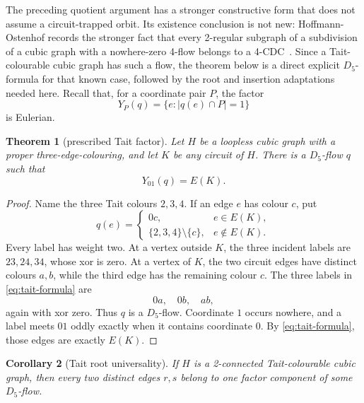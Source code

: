 \documentclass[11pt]{article}
\newtheorem{theorem}{Theorem}
\newtheorem{corollary}[theorem]{Corollary}
\theoremstyle{definition}
\theoremstyle{remark}
\begin{document}
The preceding quotient argument has a stronger constructive form that does
not assume a circuit-trapped orbit.  Its existence conclusion is not new:
Hoffmann-Ostenhof records the stronger fact that every 2-regular subgraph
of a subdivision of a cubic graph with a nowhere-zero 4-flow belongs to a
4-CDC~\cite[Lemma~0.2]{HoffmannOstenhof2012}.  Since a Tait-colourable
cubic graph has such a flow, the theorem below is a direct explicit
\(D_5\)-formula for that known case, followed by the root and insertion
adaptations needed here.  Recall that, for a coordinate pair \(P\), the factor
\[
                  Y_P(q)=\{e:|q(e)\cap P|=1\}
\]
is Eulerian.

\begin{theorem}[prescribed Tait factor]\label{thm:prescribed-tait-factor}
Let \(H\) be a loopless cubic graph with a proper three-edge-colouring, and
let \(K\) be any circuit of \(H\).  There is a \(D_5\)-flow \(q\) such that
\[
                         Y_{01}(q)=E(K).
\]
\end{theorem}

\begin{proof}
Name the three Tait colours \(2,3,4\).  If an edge \(e\) has colour \(c\),
put
\begin{equation}
 q(e)=
 \begin{cases}
   0c,&e\in E(K),\\
   \{2,3,4\}\setminus\{c\},&e\notin E(K).
 \end{cases}                                                 \tag{T}\label{eq:tait-formula}
\end{equation}
Every label has weight two.  At a vertex outside \(K\), the three incident
labels are \(23,24,34\), whose xor is zero.  At a vertex of \(K\), the two
circuit edges have distinct colours \(a,b\), while the third edge has the
remaining colour \(c\).  The three labels in \eqref{eq:tait-formula} are
\[
                              0a,\quad 0b,\quad ab,
\]
again with xor zero.  Thus \(q\) is a \(D_5\)-flow.  Coordinate \(1\)
occurs nowhere, and a label meets \(01\) oddly exactly when it contains
coordinate \(0\).  By \eqref{eq:tait-formula}, those edges are exactly
\(E(K)\).
\end{proof}

\begin{corollary}[Tait root universality]\label{cor:tait-root-universal}
If \(H\) is a 2-connected Tait-colourable cubic graph, then every two
distinct edges \(r,s\) belong to one factor component of some
\(D_5\)-flow.
\end{corollary}
\end{document}
